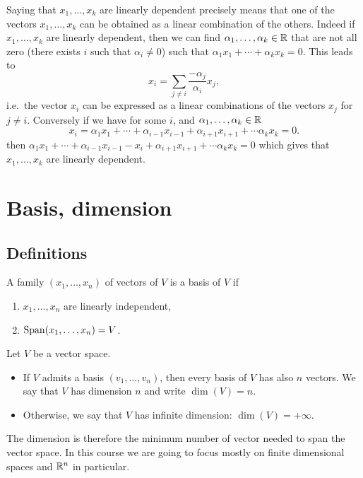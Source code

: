 \documentclass[11pt,nocut]{article}
\begin{document}
Saying that $x_1, \dots, x_k$ are linearly dependent precisely means that one of the vectors $x_1, \dots, x_k$ can be obtained as a linear combination of the others. 
Indeed if $x_1, \dots, x_k$ are linearly dependent, then we can find $\alpha_1, \dots, \alpha_k \in \mathbb{R}$ that are not all zero (there exists $i$ such that $\alpha_i \neq 0$) such that $\alpha_1 x_1 + \cdots + \alpha_k x_k = 0$. This leads to
$$
x_i = \sum_{j \neq i} \frac{- \alpha_j}{\alpha_i} x_j,
$$
i.e.\ the vector $x_i$ can be expressed as a linear combinations of the vectors $x_j$ for $j \neq i$.
Conversely if we have for some $i$, and $\alpha_1, \dots, \alpha_k \in \mathbb{R}$
$$
x_i = \alpha_1 x_1 + \cdots + \alpha_{i-1} x_{i-1} + \alpha_{i+1} x_{i+1} + \cdots \alpha_k x_k = 0.
$$
then $\alpha_1 x_1 + \cdots + \alpha_{i-1} x_{i-1} - x_i + \alpha_{i+1} x_{i+1} + \cdots \alpha_k x_k = 0$ which gives that $x_1, \dots, x_k$ are linearly dependent. 


\section{Basis, dimension}

\subsection{Definitions}
\begin{definition}[Basis]\label{def:basis}
	A family $(x_1, \dots, x_n)$ of vectors of $V$ is a basis of $V$ if
	\begin{enumerate}[label=(\roman*)]
		\item $x_1, \dots, x_n$ are linearly independent,
		\item ${{\rm Span}}(x_1, \dots, x_n) = V$.
	\end{enumerate}
\end{definition}

\begin{definition}[Dimension]
	Let $V$ be a vector space.
	\begin{itemize}
		\item If $V$ admits a basis $(v_1, \dots, v_n)$, then every basis of $V$ has also $n$ vectors. We say that $V$ has dimension $n$ and write $\dim(V) = n$.
		\item Otherwise, we say that $V$ has infinite dimension: $\dim(V) = +\infty$.
	\end{itemize}
\end{definition}
The dimension is therefore the minimum number of vector needed to span the vector space.
In this course we are going to focus mostly on finite dimensional spaces and $\mathbb{R}^n$ in particular.
\\
\end{document}
